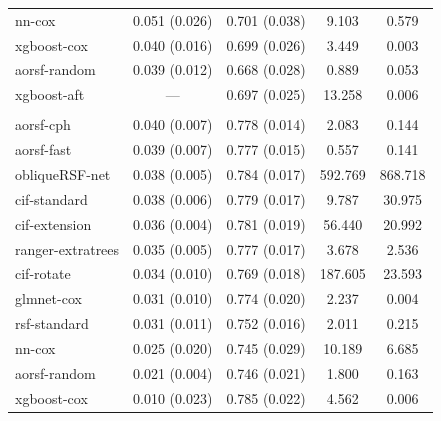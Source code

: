 \documentclass[12pt]{article}\usepackage[]{graphicx}\usepackage[]{xcolor}
\newenvironment{knitrout}{}{} %
\begin{document}
\begin{knitrout}
\begin{longtable}[t]{lcccc}
\hspace{1em}nn-cox & 0.051 (0.026) & 0.701 (0.038) & 9.103 & 0.579\\
\hspace{1em}xgboost-cox & 0.040 (0.016) & 0.699 (0.026) & 3.449 & 0.003\\
\hspace{1em}aorsf-random & 0.039 (0.012) & 0.668 (0.028) & 0.889 & 0.053\\
\hspace{1em}xgboost-aft & --- & 0.697 (0.025) & 13.258 & 0.006\\
\addlinespace[0.3em]
\multicolumn{5}{l}{\textit{\textbf{JHS; coronary heart disease, n = 3501, p = 80}}}\\
\hline
\hspace{1em}aorsf-cph & 0.040 (0.007) & 0.778 (0.014) & 2.083 & 0.144\\
\hspace{1em}aorsf-fast & 0.039 (0.007) & 0.777 (0.015) & 0.557 & 0.141\\
\hspace{1em}obliqueRSF-net & 0.038 (0.005) & 0.784 (0.017) & 592.769 & 868.718\\
\hspace{1em}cif-standard & 0.038 (0.006) & 0.779 (0.017) & 9.787 & 30.975\\
\hspace{1em}cif-extension & 0.036 (0.004) & 0.781 (0.019) & 56.440 & 20.992\\
\hspace{1em}ranger-extratrees & 0.035 (0.005) & 0.777 (0.017) & 3.678 & 2.536\\
\hspace{1em}cif-rotate & 0.034 (0.010) & 0.769 (0.018) & 187.605 & 23.593\\
\hspace{1em}glmnet-cox & 0.031 (0.010) & 0.774 (0.020) & 2.237 & 0.004\\
\hspace{1em}rsf-standard & 0.031 (0.011) & 0.752 (0.016) & 2.011 & 0.215\\
\hspace{1em}nn-cox & 0.025 (0.020) & 0.745 (0.029) & 10.189 & 6.685\\
\hspace{1em}aorsf-random & 0.021 (0.004) & 0.746 (0.021) & 1.800 & 0.163\\
\hspace{1em}xgboost-cox & 0.010 (0.023) & 0.785 (0.022) & 4.562 & 0.006\\

\end{longtable}
\end{knitrout}
\end{document}
